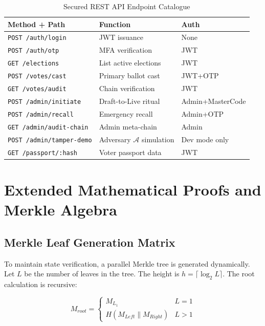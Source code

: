 \documentclass[journal,10pt,twocolumn]{IEEEtran}
\begin{document}
\begin{table}[htbp]
\caption{Secured REST API Endpoint Catalogue}
\label{tab:api_endpoints}
\centering
\small
{}
\begin{tabularx}{\linewidth}{@{}lXl@{}}
\toprule
\textbf{Method + Path} & \textbf{Function} & \textbf{Auth} \\
\midrule
\texttt{POST /auth/login} & JWT issuance & None \\
\texttt{POST /auth/otp} & MFA verification & JWT \\
\texttt{GET /elections} & List active elections & JWT \\
\texttt{POST /votes/cast} & Primary ballot cast & JWT+OTP \\
\texttt{GET /votes/audit} & Chain verification & JWT \\
\texttt{POST /admin/initiate} & Draft-to-Live ritual & Admin+MasterCode \\
\texttt{POST /admin/recall} & Emergency recall & Admin+OTP \\
\texttt{GET /admin/audit-chain} & Admin meta-chain & Admin \\
\texttt{POST /admin/tamper-demo} & Adversary $\mathcal{A}$ simulation & Dev mode only \\
\texttt{GET /passport/:hash} & Voter passport data & JWT \\
\bottomrule
\end{tabularx}
\end{table}

\section{Extended Mathematical Proofs and Merkle Algebra}

\subsection{Merkle Leaf Generation Matrix}

To maintain state verification, a parallel Merkle tree is generated dynamically. Let $L$ be the number of leaves in the tree. The height is $h = \lceil \log_2 L \rceil$. The root calculation is recursive:

\begin{equation}
    M_{root} = \begin{cases} 
      M_{L_1} & L = 1 \\
      H(M_{Left} \| M_{Right}) & L > 1 
   \end{cases}
\end{equation}
\end{document}
